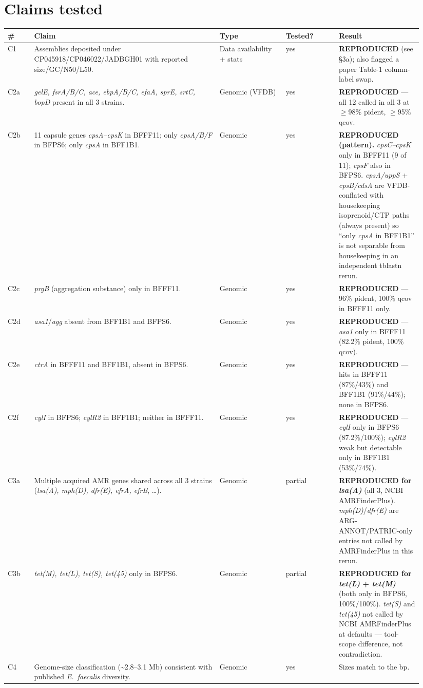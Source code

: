 \documentclass[11pt]{article}
\begin{document}
\section{Claims tested}
\begin{longtable}{@{}p{0.06\linewidth}p{0.42\linewidth}p{0.15\linewidth}p{0.12\linewidth}p{0.19\linewidth}@{}}
\toprule
\textbf{\#} & \textbf{Claim} & \textbf{Type} & \textbf{Tested?} & \textbf{Result} \\
\midrule
\endhead
C1  & Assemblies deposited under CP045918/CP046022/JADBGH01 with reported size/GC/N50/L50. & Data availability + stats & yes & \textbf{REPRODUCED} (see \S3a); also flagged a paper Table-1 column-label swap. \\
C2a & \emph{gelE, fsrA/B/C, ace, ebpA/B/C, efaA, sprE, srtC, bopD} present in all 3 strains. & Genomic (VFDB) & yes & \textbf{REPRODUCED} --- all 12 called in all 3 at $\geq$98\% pident, $\geq$95\% qcov. \\
C2b & 11 capsule genes \emph{cpsA--cpsK} in BFFF11; only \emph{cpsA/B/F} in BFPS6; only \emph{cpsA} in BFF1B1. & Genomic & yes & \textbf{REPRODUCED (pattern).} \emph{cpsC--cpsK} only in BFFF11 (9 of 11); \emph{cpsF} also in BFPS6. \emph{cpsA/uppS} + \emph{cpsB/cdsA} are VFDB-conflated with housekeeping isoprenoid/CTP paths (always present) so ``only \emph{cpsA} in BFF1B1'' is not separable from housekeeping in an independent tblastn rerun. \\
C2c & \emph{prgB} (aggregation substance) only in BFFF11. & Genomic & yes & \textbf{REPRODUCED} --- 96\% pident, 100\% qcov in BFFF11 only. \\
C2d & \emph{asa1}/\emph{agg} absent from BFF1B1 and BFPS6. & Genomic & yes & \textbf{REPRODUCED} --- \emph{asa1} only in BFFF11 (82.2\% pident, 100\% qcov). \\
C2e & \emph{ctrA} in BFFF11 and BFF1B1, absent in BFPS6. & Genomic & yes & \textbf{REPRODUCED} --- hits in BFFF11 (87\%/43\%) and BFF1B1 (91\%/44\%); none in BFPS6. \\
C2f & \emph{cylI} in BFPS6; \emph{cylR2} in BFF1B1; neither in BFFF11. & Genomic & yes & \textbf{REPRODUCED} --- \emph{cylI} only in BFPS6 (87.2\%/100\%); \emph{cylR2} weak but detectable only in BFF1B1 (53\%/74\%). \\
C3a & Multiple acquired AMR genes shared across all 3 strains (\emph{lsa(A), mph(D), dfr(E), efrA, efrB}, \ldots). & Genomic & partial & \textbf{REPRODUCED for \emph{lsa(A)}} (all 3, NCBI AMRFinderPlus). \emph{mph(D)}/\emph{dfr(E)} are ARG-ANNOT/PATRIC-only entries not called by AMRFinderPlus in this rerun. \\
C3b & \emph{tet(M), tet(L), tet(S), tet(45)} only in BFPS6. & Genomic & partial & \textbf{REPRODUCED for \emph{tet(L)} + \emph{tet(M)}} (both only in BFPS6, 100\%/100\%). \emph{tet(S)} and \emph{tet(45)} not called by NCBI AMRFinderPlus at defaults --- tool-scope difference, not contradiction. \\
C4  & Genome-size classification (\textasciitilde2.8--3.1 Mb) consistent with published \emph{E.\ faecalis} diversity. & Genomic & yes & Sizes match to the bp. \\
\bottomrule
\end{longtable}
\end{document}
